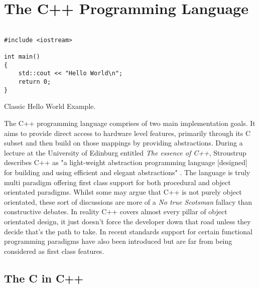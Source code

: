 \documentclass[conference, a4paper]{IEEEtran}
\begin{document}
\section{The C++ Programming Language}

\begin{listing}[h]

\begin{verbatim}

#include <iostream>

int main()
{
    std::cout << "Hello World\n";
    return 0;
}

\end{verbatim}

\caption{Classic Hello World Example.} \label{listing:1}
\end{listing}
The C++ programming language comprises of two main implementation goals. It aims to provide direct access to hardware level features, primarily through its C subset and then build on those mappings by providing abstractions. During a lecture at the University of Edinburg entitled \textit{The essence of C++}, Stroustrup describes C++ as "a light-weight abstraction programming language [designed] for building and using efficient and elegant abstractions" \cite{EssenceofC++}. The language is truly multi paradigm offering first class support for both procedural and object orientated paradigms. Whilst some may argue that C++ is not purely object orientated, these sort of discussions are more of a \textit{No true Scotsman} fallacy than constructive debates. In reality C++ covers almost every pillar of object orientated design, it just doesn't force the developer down that road unless they decide that's the path to take. In recent standards support for certain functional programming paradigms have also been introduced but are far from being considered as first class features.

\subsection{ The C in C++}
\end{document}
